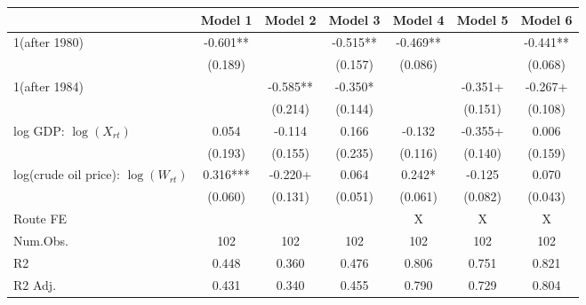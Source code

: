 
\begin{tabular}[t]{lcccccc}
\toprule
  & Model 1 & Model 2 & Model 3 & Model 4 & Model 5 & Model 6\\
\midrule
1(after 1980) & -0.601** &  & -0.515** & -0.469** &  & -0.441**\\
 & (0.189) &  & (0.157) & (0.086) &  & (0.068)\\
1(after 1984) &  & -0.585** & -0.350* &  & -0.351+ & -0.267+\\
 &  & (0.214) & (0.144) &  & (0.151) & (0.108)\\
log GDP: $\log(X_{rt})$ & 0.054 & -0.114 & 0.166 & -0.132 & -0.355+ & 0.006\\
 & (0.193) & (0.155) & (0.235) & (0.116) & (0.140) & (0.159)\\
log(crude oil price): $\log(W_{rt})$ & 0.316*** & -0.220+ & 0.064 & 0.242* & -0.125 & 0.070\\
 & (0.060) & (0.131) & (0.051) & (0.061) & (0.082) & (0.043)\\
\midrule
Route FE &  &  &  & X & X & X\\
Num.Obs. & 102 & 102 & 102 & 102 & 102 & 102\\
R2 & 0.448 & 0.360 & 0.476 & 0.806 & 0.751 & 0.821\\
R2 Adj. & 0.431 & 0.340 & 0.455 & 0.790 & 0.729 & 0.804\\
\bottomrule
\end{tabular}
